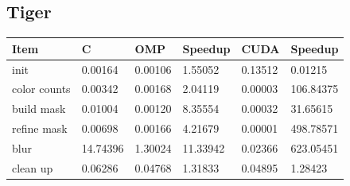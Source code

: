 \documentclass[12pt]{article}
\begin{document}
\subsection{Tiger}
\begin{tabular}{l|l|l|l|l|l}
    Item & C & OMP & Speedup & CUDA & Speedup
\\  \hline
    init & 0.00164 & 0.00106 & 1.55052 & 0.13512 & 0.01215
\\  color counts & 0.00342 & 0.00168 & 2.04119 & 0.00003 & 106.84375
\\  build mask & 0.01004 & 0.00120 & 8.35554 & 0.00032 & 31.65615
\\  refine mask & 0.00698 & 0.00166 & 4.21679 & 0.00001 & 498.78571
\\  blur & 14.74396 & 1.30024 & 11.33942 & 0.02366 & 623.05451
\\  clean up & 0.06286 & 0.04768 & 1.31833 & 0.04895 & 1.28423
\end{tabular}
\end{document}
